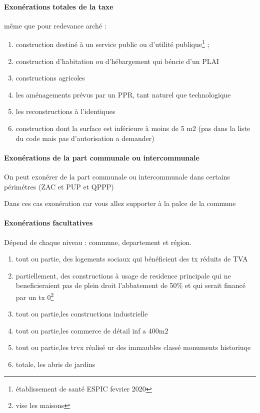 			\paragraph{Exonérations totales de la taxe}

				même que pour redevance arché :
	      \begin{enumerate}
	        \item construction destiné à un service public ou d'utilité publique\footnote{établissement de santé ESPIC fevrier 2020} ;
	        \item construction d'habitation ou d'hébargement qui béncie d'un PLAI
	        \item constructions agricoles
	        \item les aménagements prévus par un PPR, tant naturel que technologique
	        \item les reconstructions à l'identiques
	        \item construction dont la surface est inférieure à moins de 5 m2 (pas dans la liste du code mais pas d'autorisation a demander)
	      \end{enumerate}

			\paragraph{Exonérations de la part communale ou intercommunale}

				On peut exonérer de la part communale ou intercommunale dans certains périmétres (ZAC et PUP et QPPP)

				Dans ces cas exonération car vous allez supporter à la palce de la commune

			\paragraph{Exonérations facultatives}

			Dépend de chaque niveau : commune, departement et région.

			\begin{enumerate}
				\item tout ou  partie, des logements sociaux qui bénéficient des tx réduits de TVA
				\item partiellement, des constructions à usage de residence principale qui ne beneficieraient pas de plein droit l'abbatement de 50\% et qui serait financé par un tx 0\footnote{vise les maisons }
				\item tout ou  partie,les constructions industrielle
				\item tout ou  partie,les commerce de détail inf a 400m2
				\item tout ou  partie,les trvx réalisé ur des immaubles classé monuments historiuqe
				\item totale, les abris de jardins
			\end{enumerate}


